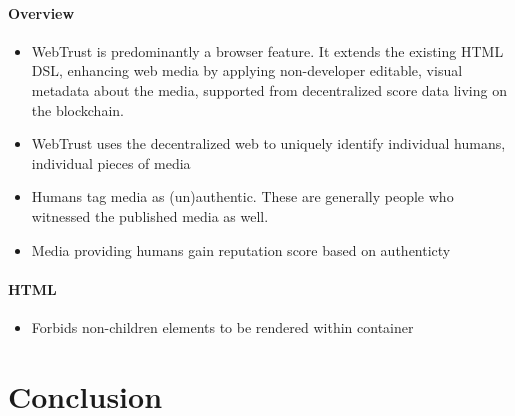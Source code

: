 \documentclass{paper}
\begin{document}
\paragraph{Overview}
\begin{itemize}
  \item WebTrust is predominantly a browser feature.  It
  extends the existing HTML DSL, enhancing web media by applying non-developer
  editable, visual metadata about the media, supported from decentralized score
  data living on the blockchain.
  \item WebTrust uses the decentralized web to uniquely identify individual humans, individual pieces of media
  \item Humans tag media as (un)authentic.  These are generally people who witnessed the published media as well.
  \item Media providing humans gain reputation score based on authenticty
\end{itemize}

\paragraph{HTML}
\begin{itemize}
  \item Forbids non-children elements to be rendered within container
\end{itemize}


\section{Conclusion}

\subsection{}
\subsubsection{}

\paragraph{}
\subparagraph{}
\end{document}
